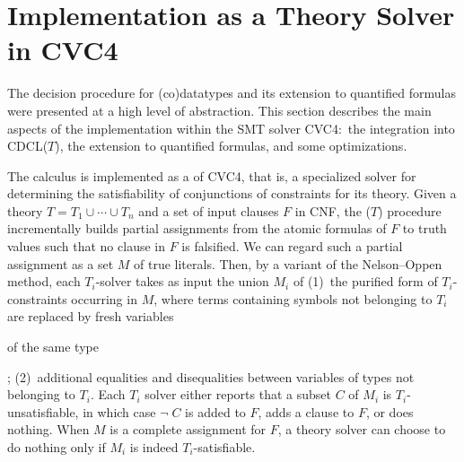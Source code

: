 \section{Implementation as a Theory Solver in CVC4}
\label{sec:implementation-as-a-theory-solver-in-cvc4}

The decision procedure for (co)datatypes and its extension to quantified
formulas were presented at a high level of abstraction. This section describes
the main aspects of the implementation within the SMT solver CVC4:\ the
integration into CDCL($T$), the extension to quantified formulas, and
some optimizations.


The calculus is implemented as a  of CVC4, that is, a
specialized solver for determining the satisfiability of conjunctions of
constraints for its theory.
Given a theory $T = T_1 \mathrel\cup \cdots \mathrel\cup T_n$ and a set of
input clauses $F$ in CNF, the \XXXL($T$) procedure
incrementally builds partial assignments from the atomic formulas of $F$ to
truth values such that no clause in $F$ is falsified. We can regard such a
partial assignment as a set $M$ of true literals.
Then, %
by a variant
\cite{jovanovic2011sharing} of the Nelson--Oppen method,
each $T_i$-solver %
takes as input the union $M_i$
of (1)~the purified form of $T_i$-constraints occurring in $M$, where terms
containing symbols not belonging to $T_i$ are replaced by fresh variables\begin{rep} of the
same type\end{rep}; (2)~additional equalities and disequalities between variables of
types not belonging to $T_i$.
Each $T_i$ solver
either reports that a subset $C$ of $M_i$ is $T_i$-unsatisfiable, in which case
$\neg\; C$ is added to $F\!$, adds a clause to $F\!$, or does nothing.
When $M$ is a complete assignment for $F\!$, a theory solver can choose to do
nothing only if $M_i$ is indeed $T_i$-satisfiable.

